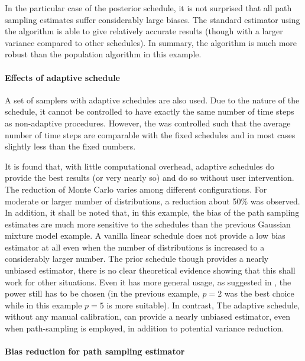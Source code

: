 In the particular case of the posterior schedule, it is not surprised that all
path sampling estimates suffer considerably large biases. The standard
estimator using the \smc[2] algorithm is able to give relatively accurate
results (though with a larger variance compared to other schedules). In
summary, the \smc algorithm is much more robust than the population \mcmc
algorithm in this example.




\paragraph{Effects of adaptive schedule}

A set of samplers with adaptive schedules are also used. Due to the nature of
the schedule, it cannot be controlled to have exactly the same number of time
steps as non-adaptive procedures. However, the \cess was controlled such that
the average number of time steps are comparable with the fixed schedules and
in most cases slightly less than the fixed numbers.

It is found that, with little computational overhead, adaptive schedules do
provide the best results (or very nearly so) and do so without user
intervention. The reduction of Monte Carlo \sd varies among different
configurations. For moderate or larger number of distributions, a reduction
about 50\% was observed. In addition, it shall be noted that, in this example,
the bias of the path sampling estimates are much more sensitive to the
schedules than the previous Gaussian mixture model example. A vanilla linear
schedule does not provide a low bias estimator at all even when the number of
distributions is increased to a considerably larger number. The prior schedule
though provides a nearly unbiased estimator, there is no clear theoretical
evidence showing that this shall work for other situations. Even it has more
general usage, as suggested in \cite{Calderhead:2009bd}, the power still has
to be chosen (in the previous \gmm example, $p = 2$ was the best choice while
in this \pet example $p = 5$ is more suitable). In contrast, The adaptive
schedule, without any manual calibration, can provide a nearly unbiased
estimator, even when path-sampling is employed, in addition to potential
variance reduction.

\paragraph{Bias reduction for path sampling estimator}

